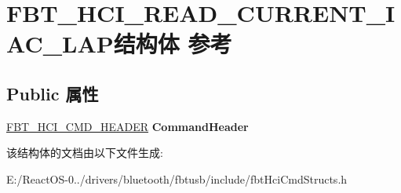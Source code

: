 \hypertarget{struct_f_b_t___h_c_i___r_e_a_d___c_u_r_r_e_n_t___i_a_c___l_a_p}{}\section{F\+B\+T\+\_\+\+H\+C\+I\+\_\+\+R\+E\+A\+D\+\_\+\+C\+U\+R\+R\+E\+N\+T\+\_\+\+I\+A\+C\+\_\+\+L\+A\+P结构体 参考}
\label{struct_f_b_t___h_c_i___r_e_a_d___c_u_r_r_e_n_t___i_a_c___l_a_p}
\subsection*{Public 属性}
\begin{DoxyCompactItemize}
\item 
\mbox{\label{struct_f_b_t___h_c_i___r_e_a_d___c_u_r_r_e_n_t___i_a_c___l_a_p_a755dd46bb714eb6d28d7bb266b317643}} 
\hyperlink{struct_f_b_t___h_c_i___c_m_d___h_e_a_d_e_r}{F\+B\+T\+\_\+\+H\+C\+I\+\_\+\+C\+M\+D\+\_\+\+H\+E\+A\+D\+ER} {\bfseries Command\+Header}
\end{DoxyCompactItemize}


该结构体的文档由以下文件生成\+:\begin{DoxyCompactItemize}
\item 
E\+:/\+React\+O\+S-\/0../drivers/bluetooth/fbtusb/include/fbt\+Hci\+Cmd\+Structs.\+h\end{DoxyCompactItemize}
